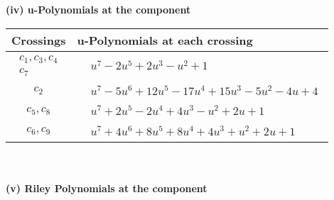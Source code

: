 \documentclass[1p]{elsarticle_modified}
\theoremstyle{definition}
\begin{document}
\newpage\renewcommand{\arraystretch}{1}
\flushleft \textbf{(iv) u-Polynomials at the component}\newline \\
\begin{tabular}{m{50pt}|m{274pt}}
Crossings & \hspace{64pt}u-Polynomials at each crossing \\
\hline $$\begin{aligned}c_{1},c_{3},c_{4}\\c_{7}\end{aligned}$$&$\begin{aligned}
&u^7-2 u^5+2 u^3- u^2+1
\end{aligned}$\\
\hline $$\begin{aligned}c_{2}\end{aligned}$$&$\begin{aligned}
&u^7-5 u^6+12 u^5-17 u^4+15 u^3-5 u^2-4 u+4
\end{aligned}$\\
\hline $$\begin{aligned}c_{5},c_{8}\end{aligned}$$&$\begin{aligned}
&u^7+2 u^5-2 u^4+4 u^3- u^2+2 u+1
\end{aligned}$\\
\hline $$\begin{aligned}c_{6},c_{9}\end{aligned}$$&$\begin{aligned}
&u^7+4 u^6+8 u^5+8 u^4+4 u^3+u^2+2 u+1
\end{aligned}$\\
\hline
\end{tabular}\\~\\
\newpage\renewcommand{\arraystretch}{1}
\flushleft \textbf{(v) Riley Polynomials at the component}\newline \\
\end{document}
